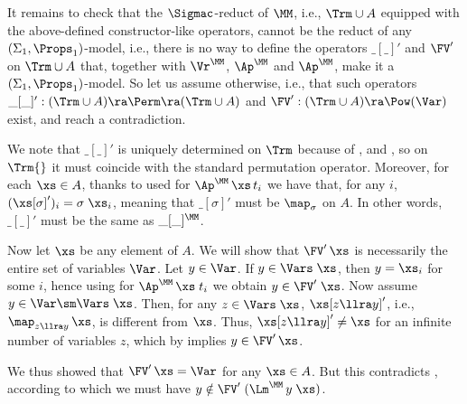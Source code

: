 It remains to check that the $\Sigmac$-reduct of $\MM$, i.e., $\Trm \cup A$ equipped with the above-defined constructor-like operators, cannot be the reduct of any $(\Sigma_1,\Props_1)$-model, i.e., there is no way to define the operators 
$\_[\_]'$ and $\FV'$ on $\Trm \cup A$ that, together with $\Vr^\MM$, $\Ap^\MM$ and $\Ap^\MM$, make it a $(\Sigma_1,\Props_1)$-model.  So let us assume otherwise, 
i.e., that such operators $\_[\_]' : (\Trm \cup A) \ra \Perm \ra (\Trm \cup A)$ and $\FV' : (\Trm \cup A) \ra \Pow(\Var)$ exist, 
and reach a contradiction. 

We note that $\_[\_]'$ is uniquely determined on $\Trm$ because of \PmVr{}, \PmAp{} and \PmLm{}, so on $\Trm{}$ it must coincide with the standard permutation operator. 
Moreover, for each $\xs \in A$, thanks to \PmAp{} used for $\Ap^\MM\,\xs\,t_i$ we have that, for any $i$, $(\xs[\sigma]')_i = \sigma\;\xs_i$, meaning that $\_[\sigma]'$ must be $\map_\sigma$ on $A$. In other words, $\_[\_]'$ must be the same as $\_[\_]^\MM$. 

Now let $\xs$ be any element of $A$. We will show that $\FV'\,\xs$ is necessarily the entire set of variables $\Var$. Let $y\in \Var$. If $y \in \Vars\;\xs$, then $y=\xs_i$ for some $i$, hence using \FvAp{} for $\Ap^\MM\,\xs\;t_i$ we obtain $y \in \FV'\;\xs$. 
Now assume $y \in \Var \sm \Vars\;\xs$. Then, for any $z\in \Vars\;\xs$, $\xs[z \llra y]'$, i.e., 
$\map_{z \llra y}\,\xs$, is different from $\xs$. Thus, $\xs[z \llra y]' \not= \xs$ 
for an infinite number of variables $z$, which by \FvDPm{} implies $y \in \FV'\,\xs$.
 
We thus showed that $\FV'\,\xs = \Var$ for any $\xs\in A$. But this contradicts \FCB{}, according to which we must have $y \notin \FV'\;(\Lm^\MM\,y\;\xs)$.

